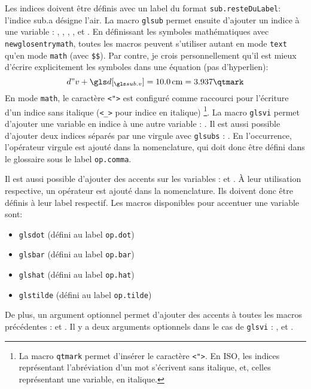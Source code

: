 \documentclass[PhD,nohyperref,english,french]{ulthese}
\begin{document}
Les indices doivent être définis avec un label du format \texttt{sub.resteDuLabel}: l'indice \gls{sub.a} désigne l'air. La macro \texttt{glsub} permet ensuite d'ajouter un indice à une variable : , , , ,  et . En définissant les symboles mathématiques avec \texttt{newglosentrymath}, toutes les macros peuvent s'utiliser autant en mode \texttt{text} qu'en mode \texttt{math} (avec \texttt{\$\$}). Par contre, je crois personnellement qu'il est mieux d'écrire explicitement les symboles dans une équation (pas d'hyperlien):
\begin{equation}
d"v + \glsub{d}{v} = \SI{10.0}{\centi\meter} = 3.937\qtmark
\end{equation}
En mode \texttt{math}, le caractère \texttt{<">} est configuré comme raccourci pour l'écriture d'un indice sans italique (\texttt{<\_>} pour indice en italique) \footnote{ La macro \texttt{qtmark} permet d'insérer le caractère \texttt{<">}. En ISO, les indices représentant l'abréviation d'un mot s'écrivent sans italique, et, celles représentant une variable, en italique.}. La macro \texttt{glsvi} permet d'ajouter une variable en indice à une autre variable : . Il est aussi possible d'ajouter deux indices séparés par une virgule avec \texttt{glsubs} : . En l’occurrence, l'opérateur virgule est ajouté dans la nomenclature, qui doit donc être défini dans le glossaire sous le label \texttt{op.comma}.

Il est aussi possible d'ajouter des accents sur les variables :  et . À leur utilisation respective, un opérateur est ajouté dans la nomenclature. Ils doivent donc être définis à leur label respectif. Les macros disponibles pour accentuer une variable sont:
\begin{itemize} 
	\item \texttt{glsdot} (défini au label \texttt{op.dot})
	\item \texttt{glsbar} (défini au label \texttt{op.bar})
	\item \texttt{glshat} (défini au label \texttt{op.hat})
	\item \texttt{glstilde} (défini au label \texttt{op.tilde})
\end{itemize}
De plus, un argument optionnel permet d'ajouter des accents à toutes les macros précédentes :  et . Il y a deux arguments optionnels dans le cas de \texttt{glsvi} : ,  et .
\end{document}
